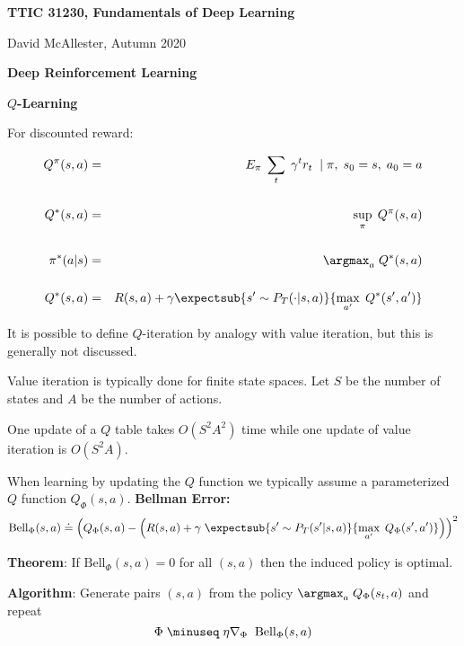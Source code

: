 




{\Huge

  \centerline{\bf TTIC 31230, Fundamentals of Deep Learning}
  \bigskip
  \centerline{David McAllester, Autumn 2020}
\vfill
  \centerline{\bf Deep Reinforcement Learning}
  \vfill
  \centerline{\bf $Q$-Learning}
  \vfill
\vfill


For discounted reward:

\begin{eqnarray*}
  Q^\pi(s,a) & = & E_\pi\;\sum_t \;\gamma^tr_t \;\;|\; \pi, \; s_0 = s,\;a_0 = a \\
  \\
  Q^*(s,a) & = & \sup_\pi \;Q^\pi(s,a) \\
  \\
  \pi^*(a|s) & = & \argmax_a\;Q^*(s,a) \\
  \\
  Q^*(s,a) & = & R(s,a) + \gamma \expectsub{s' \sim P_T(\cdot|s,a)}{\max_{a'}\; Q^*(s',a')}
\end{eqnarray*}


It is possible to define $Q$-iteration by analogy with value iteration, but this is generally not discussed.

\vfill
Value iteration is typically done for finite state spaces.  Let $S$ be the number of states and $A$ be the number of actions.

\vfill
One update of a $Q$ table takes $O(S^2A^2)$ time while one update of value iteration is $O(S^2A)$.


When learning by updating the $Q$ function we typically assume a parameterized $Q$ function $Q_\Phi(s,a)$.
\vfill
{\bf Bellman Error:}
{\huge $$\mathrm{Bell}_\Phi(s,a) \doteq \left(Q_\Phi(s,a) - \left(R(s,a) + \gamma\;\expectsub{s' \sim P_T(s'|s,a)}{\max_{a'}\;Q_\Phi(s',a')}\right)\right)^2$$}

{\bf Theorem}: If $\mathrm{Bell}_\Phi(s,a) = 0$ for all $(s,a)$ then the induced policy is optimal.

\vfill
{\bf Algorithm}: Generate pairs $(s,a)$ from the policy $\argmax_a\;Q_\Phi(s_t,a)$ and repeat
$$\Phi \;\minuseq\; \eta \nabla_\Phi \;\; \mathrm{Bell}_\Phi(s,a)$$



}
